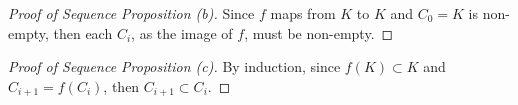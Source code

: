 \documentclass[../9extra]{subfiles}
\begin{document}
\begin{proof}[Proof of Sequence Proposition (b)]
	Since $f$ maps from $K$ to $K$ and $C_0 = K$ is non-empty, then each $C_i$, as the image of $f$, must be non-empty.
\end{proof}

\begin{proof}[Proof of Sequence Proposition (c)]
	By induction, since $f(K)\subset K$ and $C_{i+1} = f(C_i)$, then $C_{i+1}\subset C_i$.
\end{proof}
\end{document}
